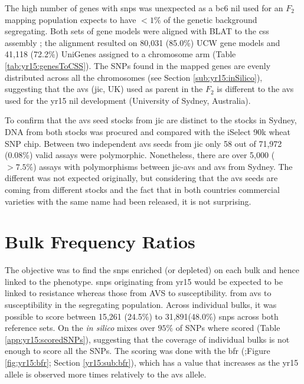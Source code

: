 

The high number of genes with \gls{snp}s was unexpected as a \gls{bc}6 \gls{nil} used for an $F_2$ mapping population expects to have $<1\%$ of the genetic background segregating. 
Both sets of gene models were aligned with BLAT \citep{Kent2002} to the \gls{css} assembly \citep{Mayer2014}; the alignment resulted on 80,031 (85.0\%) UCW gene models and 41,118 (72.2\%) UniGenes assigned to a chromosome arm (Table \ref{tab:yr15:genesToCSS}). 
The SNPs found in the mapped genes are evenly distributed across all the chromosomes (see Section \ref{sub:yr15:inSilico}), suggesting that the \gls{avs} (\gls{jic}, UK) used as parent in the $F_{2}$ is different to the \gls{avs} used for the \acrshort{yr15} \acrshort{nil} development (University of Sydney, Australia).  

To confirm that the \gls{avs} seed stocks from \gls{jic} are distinct to the stocks in Sydney, DNA from both stocks was procured and compared with the iSelect 90k wheat SNP chip. 
Between two independent \gls{avs} seeds from \gls{jic} only 58 out of 71,972 (0.08\%) valid assays were polymorphic. 
Nonetheless, there are over 5,000 ($>7.5\%$) assays with polymorphisms between  \gls{jic}-\gls{avs} and \gls{avs} from Sydney. 
The different was not expected originally, but considering that the \gls{avs} seeds are coming from different stocks and the fact that in both countries commercial varieties with the same name had been released, it is not surprising. 


\section{Bulk Frequency Ratios}
\label{sec:yr15:bfr}



The objective was to find the \acrshort{snp}s enriched  (or depleted) on each bulk and hence linked to the phenotype.  \Glspl{snp} originating from \gls{yr15} would be expected to be linked to resistance whereas those from AVS to susceptibility. from \gls{avs} to susceptibility in the segregating population. 
Across individual bulks, it was possible to score between 15,261 (24.5\%) to 31,891(48.0\%) \glspl{snp} across both reference sets.
On the \textit{in silico} mixes over $95\%$ of SNPs where scored (Table \ref{app:yr15:scoredSNPs}), suggesting that the coverage of individual bulks is not enough to score all the SNPs.  
The scoring was done with the \acrlong{bfr} (\citealt{Trick2012};Figure \ref{fig:yr15:bfr}; Section \ref{yr15:sub:bfr}), which has a value that increases as the \acrshort{yr15} allele is observed more times relatively to the \acrshort{avs} allele.

